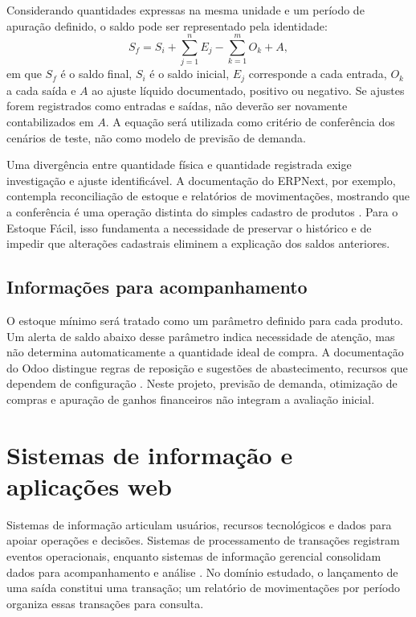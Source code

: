 Considerando quantidades expressas na mesma unidade e um período de apuração definido, o saldo pode ser representado pela identidade:
\begin{equation}
    S_f = S_i + \sum_{j=1}^{n} E_j - \sum_{k=1}^{m} O_k + A,
    \label{eq:saldo}
\end{equation}
em que $S_f$ é o saldo final, $S_i$ é o saldo inicial, $E_j$ corresponde a cada entrada, $O_k$ a cada saída e $A$ ao ajuste líquido documentado, positivo ou negativo. Se ajustes forem registrados como entradas e saídas, não deverão ser novamente contabilizados em $A$. A equação será utilizada como critério de conferência dos cenários de teste, não como modelo de previsão de demanda.

Uma divergência entre quantidade física e quantidade registrada exige investigação e ajuste identificável. A documentação do ERPNext, por exemplo, contempla reconciliação de estoque e relatórios de movimentações, mostrando que a conferência é uma operação distinta do simples cadastro de produtos \cite{ERPNextStock}. Para o Estoque Fácil, isso fundamenta a necessidade de preservar o histórico e de impedir que alterações cadastrais eliminem a explicação dos saldos anteriores.

\subsection{Informações para acompanhamento}

O estoque mínimo será tratado como um parâmetro definido para cada produto. Um alerta de saldo abaixo desse parâmetro indica necessidade de atenção, mas não determina automaticamente a quantidade ideal de compra. A documentação do Odoo distingue regras de reposição e sugestões de abastecimento, recursos que dependem de configuração \cite{OdooReposicao}. Neste projeto, previsão de demanda, otimização de compras e apuração de ganhos financeiros não integram a avaliação inicial.

\section{Sistemas de informação e aplicações web}

Sistemas de informação articulam usuários, recursos tecnológicos e dados para apoiar operações e decisões. Sistemas de processamento de transações registram eventos operacionais, enquanto sistemas de informação gerencial consolidam dados para acompanhamento e análise \cite{OpenStaxSI}. No domínio estudado, o lançamento de uma saída constitui uma transação; um relatório de movimentações por período organiza essas transações para consulta.

